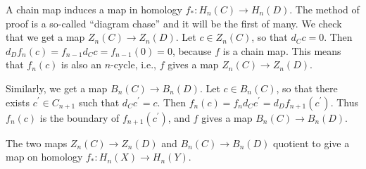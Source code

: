 A chain map induces a map in homology $f_\ast: H_n(C)\to H_n(D)$. The method of proof is a so-called ``diagram chase'' and it will be the first of many. We check that we get a map $Z_n(C)\to Z_n(D)$. Let $c\in Z_n(C)$, so that $d_C c = 0$. Then $d_D f_n(c) = f_{n-1}d_C c = f_{n-1}(0) = 0$, because $f$ is a chain map. This means that $f_n(c)$ is also an $n$-cycle, i.e., $f$ gives a map $Z_n(C)\to Z_n(D)$.

Similarly, we get a map $B_n(C)\to B_n(D)$. Let $c\in B_n(C)$, so that there exists $c^\prime \in C_{n+1}$ such that $d_C c^\prime = c$. Then $f_n(c) = f_nd_C c^\prime = d_D f_{n+1}(c^\prime)$. Thus $f_n(c)$ is the boundary of $f_{n+1}(c^\prime)$, and $f$ gives a map $B_n(C)\to B_n(D)$.

The two maps $Z_n(C)\to Z_n(D)$ and $B_n(C)\to B_n(D)$ quotient to give a map on homology $f_\ast: H_n(X)\to H_n(Y)$.
